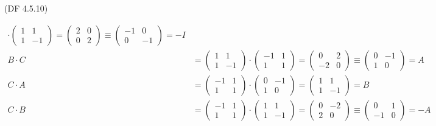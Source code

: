 \begin{problem}{(\textsf{DF 4.5.10})}
\begin{enumalph}
\begin{Answer}
\begin{align*}
          \cdot \begin{pmatrix} 1 & 1 \\ 1 & -1 \end{pmatrix}
          = \begin{pmatrix} 2 & 0 \\ 0 & 2 \end{pmatrix}
          \equiv \begin{pmatrix} -1 & 0 \\ 0 & -1 \end{pmatrix} = -I \\
          B \cdot C &= \begin{pmatrix} 1 & 1 \\ 1 & -1 \end{pmatrix}
          \cdot \begin{pmatrix} -1 & 1 \\ 1 & 1 \end{pmatrix}
          = \begin{pmatrix} 0 & 2 \\ -2 & 0 \end{pmatrix}
          \equiv \begin{pmatrix} 0 & -1 \\ 1 & 0 \end{pmatrix} = A \\
          C \cdot A &= \begin{pmatrix} -1 & 1 \\ 1 & 1 \end{pmatrix}
          \cdot \begin{pmatrix} 0 & -1 \\ 1 & 0 \end{pmatrix}
          = \begin{pmatrix} 1 & 1 \\ 1 & -1 \end{pmatrix} = B \\
          C \cdot B &= \begin{pmatrix} -1 & 1 \\ 1 & 1 \end{pmatrix}
          \cdot \begin{pmatrix} 1 & 1 \\ 1 & -1 \end{pmatrix}
          = \begin{pmatrix} 0 & -2 \\ 2 & 0 \end{pmatrix}
          \equiv \begin{pmatrix} 0 & 1 \\ -1 & 0 \end{pmatrix} = -A \\

\end{align*}
\end{Answer}
\end{enumalph}
\end{problem}

